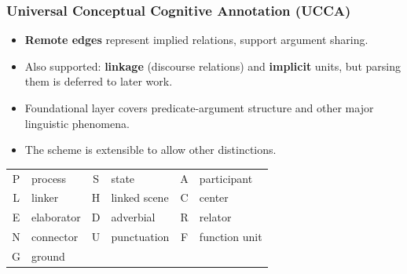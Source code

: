 \documentclass[t]{beamer}
\begin{document}
\begin{frame}
\frametitle{Universal Conceptual Cognitive Annotation (UCCA)}
\begin{itemize}
 \item \textbf{Remote edges} represent implied relations, support argument sharing.
 \item Also supported: \textbf{linkage} (discourse relations) and \textbf{implicit} units,
 but parsing them is deferred to later work.
 \item Foundational layer covers predicate-argument structure and other major linguistic phenomena.
 \item The scheme is extensible to allow other distinctions.
\end{itemize}

\vfill
\begin{center}
  \begin{adjustbox}{margin=2mm,frame}
  \begin{tabular}{cl|cl|cl}
	  P & process &
	  S & state &
	  A & participant \\
	  L & linker &
	  H & linked scene &
	  C & center \\
	  E & elaborator &
	  D & adverbial &
	  R & relator \\
	  N & connector &
	  U & punctuation &
	  F & function unit \\
	  G & ground
  \end{tabular}
  \end{adjustbox}
\end{center}
\end{frame}
\end{document}
